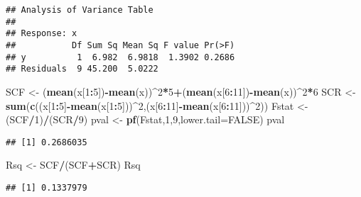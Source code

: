 \documentclass[
]{article}
\newenvironment{Shaded}{\begin{snugshade}}{\end{snugshade}}
\newcommand{\DataTypeTok}[1]{\textcolor[rgb]{0.13,0.29,0.53}{#1}}
\newcommand{\DecValTok}[1]{\textcolor[rgb]{0.00,0.00,0.81}{#1}}
\newcommand{\KeywordTok}[1]{\textcolor[rgb]{0.13,0.29,0.53}{\textbf{#1}}}
\newcommand{\NormalTok}[1]{#1}
\newcommand{\OperatorTok}[1]{\textcolor[rgb]{0.81,0.36,0.00}{\textbf{#1}}}
\newcommand{\OtherTok}[1]{\textcolor[rgb]{0.56,0.35,0.01}{#1}}
\newcommand{\StringTok}[1]{\textcolor[rgb]{0.31,0.60,0.02}{#1}}
\begin{document}
\begin{verbatim}
## Analysis of Variance Table
## 
## Response: x
##           Df Sum Sq Mean Sq F value Pr(>F)
## y          1  6.982  6.9818  1.3902 0.2686
## Residuals  9 45.200  5.0222
\end{verbatim}

\begin{Shaded}
\begin{Highlighting}[]
\NormalTok{SCF <-}\StringTok{ }\NormalTok{(}\KeywordTok{mean}\NormalTok{(x[}\DecValTok{1}\OperatorTok{:}\DecValTok{5}\NormalTok{])}\OperatorTok{-}\KeywordTok{mean}\NormalTok{(x))}\OperatorTok{^}\DecValTok{2}\OperatorTok{*}\DecValTok{5}\OperatorTok{+}\NormalTok{(}\KeywordTok{mean}\NormalTok{(x[}\DecValTok{6}\OperatorTok{:}\DecValTok{11}\NormalTok{])}\OperatorTok{-}\KeywordTok{mean}\NormalTok{(x))}\OperatorTok{^}\DecValTok{2}\OperatorTok{*}\DecValTok{6}
\NormalTok{SCR <-}\StringTok{ }\KeywordTok{sum}\NormalTok{(}\KeywordTok{c}\NormalTok{((x[}\DecValTok{1}\OperatorTok{:}\DecValTok{5}\NormalTok{]}\OperatorTok{-}\KeywordTok{mean}\NormalTok{(x[}\DecValTok{1}\OperatorTok{:}\DecValTok{5}\NormalTok{]))}\OperatorTok{^}\DecValTok{2}\NormalTok{,(x[}\DecValTok{6}\OperatorTok{:}\DecValTok{11}\NormalTok{]}\OperatorTok{-}\KeywordTok{mean}\NormalTok{(x[}\DecValTok{6}\OperatorTok{:}\DecValTok{11}\NormalTok{]))}\OperatorTok{^}\DecValTok{2}\NormalTok{))}
\NormalTok{Fstat <-}\StringTok{ }\NormalTok{(SCF}\OperatorTok{/}\DecValTok{1}\NormalTok{)}\OperatorTok{/}\NormalTok{(SCR}\OperatorTok{/}\DecValTok{9}\NormalTok{)}
\NormalTok{pval <-}\StringTok{ }\KeywordTok{pf}\NormalTok{(Fstat,}\DecValTok{1}\NormalTok{,}\DecValTok{9}\NormalTok{,}\DataTypeTok{lower.tail=}\OtherTok{FALSE}\NormalTok{)}
\NormalTok{pval}
\end{Highlighting}
\end{Shaded}

\begin{verbatim}
## [1] 0.2686035
\end{verbatim}

\begin{Shaded}
\begin{Highlighting}[]
\NormalTok{Rsq <-}\StringTok{ }\NormalTok{SCF}\OperatorTok{/}\NormalTok{(SCF}\OperatorTok{+}\NormalTok{SCR)}
\NormalTok{Rsq}
\end{Highlighting}
\end{Shaded}

\begin{verbatim}
## [1] 0.1337979
\end{verbatim}
\end{document}
